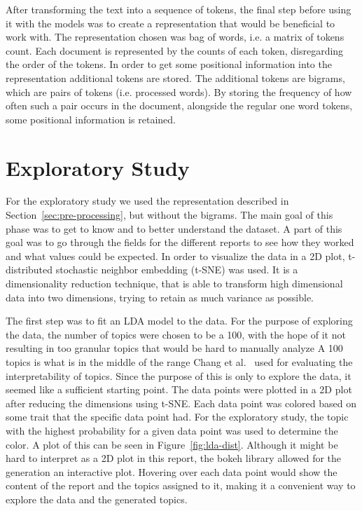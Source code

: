 After transforming the text into a sequence of tokens, the final step before using it with the models was to create a representation that would be beneficial to work with.
The representation chosen was bag of words, i.e. a matrix of tokens count.
Each document is represented by the counts of each token, disregarding the order of the tokens.
In order to get some positional information into the representation additional tokens are stored. 
The additional tokens are bigrams, which are pairs of tokens (i.e. processed words).
By storing the frequency of how often such a pair occurs in the document, alongside the regular one word tokens, some positional information is retained.

\section{Exploratory Study}\label{sec:exploratory-study}
For the exploratory study we used the representation described in Section~\ref{sec:pre-processing}, but without the bigrams.
The main goal of this phase was to get to know and to better understand the dataset.
A part of this goal was to go through the fields for the different reports to see how they worked and what values could be expected.
In order to visualize the data in a 2D plot, t-distributed stochastic neighbor embedding (t-SNE) was used.
It is a dimensionality reduction technique, that is able to transform high dimensional data into two dimensions, trying to retain as much variance as possible.

The first step was to fit an LDA model to the data.
For the purpose of exploring the data, the number of topics were chosen to be a 100, with the hope of it not resulting in too granular topics that would be hard to manually analyze
A 100 topics is what is in the middle of the range Chang et al\@.~\cite{chang2009reading} used for evaluating the interpretability of topics.
Since the purpose of this is only to explore the data, it seemed like a sufficient starting point.
The data points were plotted in a 2D plot after reducing the dimensions using t-SNE.
Each data point was colored based on some trait that the specific data point had.
For the exploratory study, the topic with the highest probability for a given data point was used to determine the color.
A plot of this can be seen in Figure~\ref{fig:lda-dist}.
Although it might be hard to interpret as a 2D plot in this report, the bokeh library allowed for the generation an interactive plot.
Hovering over each data point would show the content of the report and the topics assigned to it, making it a convenient way to explore the data and the generated topics.

